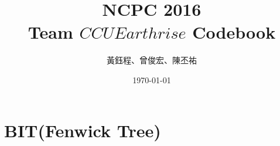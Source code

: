 \documentclass[10pt]{article}
\title{NCPC 2016\\ Team $CCU Earthrise$ Codebook} %
\author{黃鈺程、曾俊宏、陳丕祐}
\date{\today}
\begin{document}
 

\begin{titlepage}
\maketitle
\end{titlepage}

\tableofcontents
\newpage


%

\section{BIT(Fenwick Tree)}

%

\newpage
\end{document}
